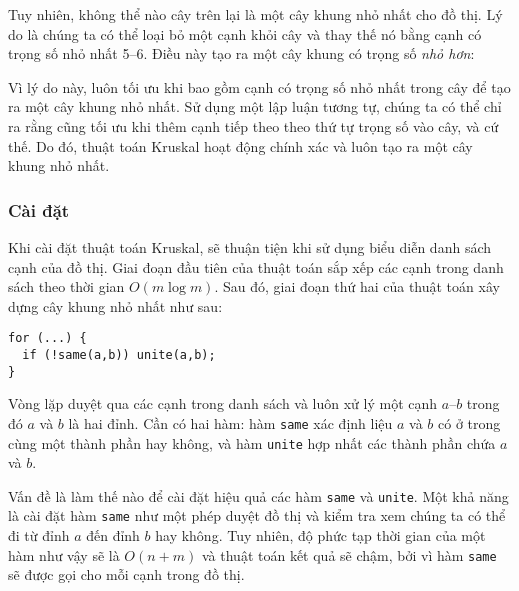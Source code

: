 Tuy nhiên, không thể nào cây trên
lại là một cây khung nhỏ nhất cho đồ thị.
Lý do là chúng ta có thể loại bỏ một cạnh
khỏi cây và thay thế nó bằng cạnh có trọng số nhỏ nhất 5--6.
Điều này tạo ra một cây khung có trọng số
\emph{nhỏ hơn}:

\begin{center}
\end{center}

Vì lý do này, luôn tối ưu
khi bao gồm cạnh có trọng số nhỏ nhất
trong cây để tạo ra một cây khung nhỏ nhất.
Sử dụng một lập luận tương tự, chúng ta có thể chỉ ra rằng
cũng tối ưu khi thêm cạnh tiếp theo theo thứ tự trọng số
vào cây, và cứ thế.
Do đó, thuật toán Kruskal hoạt động chính xác và
luôn tạo ra một cây khung nhỏ nhất.

\subsubsection{Cài đặt}

Khi cài đặt thuật toán Kruskal,
sẽ thuận tiện khi sử dụng
biểu diễn danh sách cạnh của đồ thị.
Giai đoạn đầu tiên của thuật toán sắp xếp các
cạnh trong danh sách theo thời gian $O(m \log m)$.
Sau đó, giai đoạn thứ hai của thuật toán
xây dựng cây khung nhỏ nhất như sau:

\begin{lstlisting}
for (...) {
  if (!same(a,b)) unite(a,b);
}
\end{lstlisting}

Vòng lặp duyệt qua các cạnh trong danh sách
và luôn xử lý một cạnh $a$--$b$
trong đó $a$ và $b$ là hai đỉnh.
Cần có hai hàm:
hàm \texttt{same} xác định
liệu $a$ và $b$ có ở trong cùng một thành phần hay không,
và hàm \texttt{unite}
hợp nhất các thành phần chứa $a$ và $b$.

Vấn đề là làm thế nào để cài đặt hiệu quả
các hàm \texttt{same} và \texttt{unite}.
Một khả năng là cài đặt hàm
\texttt{same} như một phép duyệt đồ thị và kiểm tra xem
chúng ta có thể đi từ đỉnh $a$ đến đỉnh $b$ hay không.
Tuy nhiên, độ phức tạp thời gian của một hàm như vậy
sẽ là $O(n+m)$
và thuật toán kết quả sẽ chậm,
bởi vì hàm \texttt{same} sẽ được gọi cho mỗi cạnh trong đồ thị.

